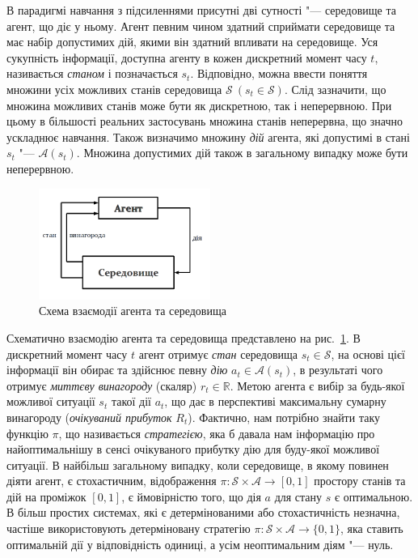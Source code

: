 \documentclass[a4paper,10pt,fleqn]{article}
\begin{document}
В парадигмі навчання з підсиленнями присутні дві сутності "--- середовище та агент, що діє у ньому. Агент певним чином здатний сприймати середовище та має набір допустимих дій, якими він здатний впливати на середовище. Уся сукупність інформації, доступна агенту в кожен дискретний момент часу $t$, називається \emph{станом} і позначається $s_t$. Відповідно, можна ввести поняття множини усіх можливих станів середовища $\mathcal{S}\ (s_t \in \mathcal{S})$. Слід зазначити, що множина можливих станів може бути як дискретною, так і неперервною. При цьому в більшості реальних застосувань множина станів неперервна, що значно ускладнює навчання. Також визначимо множину \emph{дій} агента, які допустимі в стані $s_t$ "--- $\mathcal{A}(s_t)$. Множина допустимих дій також в загальному випадку може бути неперервною.

\begin{figure}
\centering
\includegraphics[width=0.5\textwidth]{agent-env-diagram.png}
\caption{Схема взаємодії агента та середовища}
\label{fig:agent-env-diagram}
\end{figure}
Схематично взаємодію агента та середовища представлено на рис.~\ref{fig:agent-env-diagram}. В дискретний момент часу $t$ агент отримує \emph{стан} середовища $s_t \in \mathcal{S}$, на основі цієї інформації він обирає та здійснює певну \emph{дію} $a_t \in \mathcal{A}(s_t)$, в результаті чого отримує \emph{миттєву винагороду} (скаляр) $r_t \in \mathbb{R}$. Метою агента є вибір за будь-якої можливої ситуації $s_t$ такої дії $a_t$, що дає в перспективі максимальну сумарну винагороду (\emph{очікуваний прибуток} $R_t$). Фактично, нам потрібно знайти таку функцію $\pi$, що називається \emph{стратегією}, яка б давала нам інформацію про найоптимальнішу в сенсі очікуваного прибутку дію для буду-якої можливої ситуації. В найбільш загальному випадку, коли середовище, в якому повинен діяти агент, є стохастичним, відображення $\pi:\mathcal{S}\times\mathcal{A} \rightarrow [0,1]$ простору станів та дій на проміжок $[0,1]$, є ймовірністю того, що дія $a$ для стану $s$ є оптимальною. В більш простих системах, які є детермінованими або стохастичність незначна, частіше використовують детерміновану стратегію $\pi:\mathcal{S}\times\mathcal{A} \rightarrow \{0,1\}$, яка ставить оптимальній дії у відповідність одиниці, а усім неоптимальним діям "--- нуль.
\end{document}
